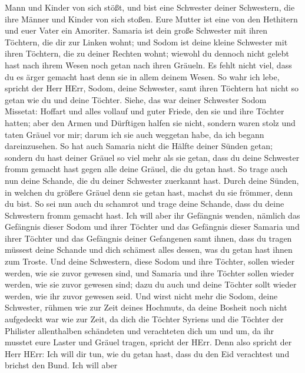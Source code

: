 Mann und Kinder von sich stößt, und bist eine Schwester deiner
Schwestern, die ihre Männer und Kinder von sich stoßen. Eure Mutter ist
eine von den Hethitern und euer Vater ein Amoriter. 
Samaria ist dein große Schwester mit ihren Töchtern, die dir zur Linken
wohnt; und Sodom ist deine kleine Schwester mit ihren Töchtern, die zu
deiner Rechten wohnt;  wiewohl du dennoch nicht gelebt hast
nach ihrem Wesen noch getan nach ihren Gräueln. Es fehlt nicht viel,
dass du es ärger gemacht hast denn sie in allem deinem Wesen.
 So wahr ich lebe, spricht der Herr HErr, Sodom, deine
Schwester, samt ihren Töchtern hat nicht so getan wie du und deine
Töchter.  Siehe, das war deiner Schwester Sodom Missetat:
Hoffart und alles vollauf und guter Friede, den sie und ihre Töchter
hatten; aber den Armen und Dürftigen halfen sie nicht, 
sondern waren stolz und taten Gräuel vor mir; darum ich sie auch
weggetan habe, da ich begann dareinzusehen.  So hat auch
Samaria nicht die Hälfte deiner Sünden getan; sondern du hast deiner
Gräuel so viel mehr als sie getan, dass du deine Schwester fromm gemacht
hast gegen alle deine Gräuel, die du getan hast.  So trage
auch nun deine Schande, die du deiner Schwester zuerkannt hast. Durch
deine Sünden, in welchen du größere Gräuel denn sie getan hast, machst
du sie frömmer, denn du bist. So sei nun auch du schamrot und trage
deine Schande, dass du deine Schwestern fromm gemacht hast.
 Ich will aber ihr Gefängnis wenden, nämlich das Gefängnis
dieser Sodom und ihrer Töchter und das Gefängnis dieser Samaria und
ihrer Töchter und das Gefängnis deiner Gefangenen samt ihnen,
 dass du tragen müssest deine Schande und dich schämest
alles dessen, was du getan hast ihnen zum Troste.  Und
deine Schwestern, diese Sodom und ihre Töchter, sollen wieder werden,
wie sie zuvor gewesen sind, und Samaria und ihre Töchter sollen wieder
werden, wie sie zuvor gewesen sind; dazu du auch und deine Töchter sollt
wieder werden, wie ihr zuvor gewesen seid.  Und wirst nicht
mehr die Sodom, deine Schwester, rühmen wie zur Zeit deines Hochmuts,
 da deine Bosheit noch nicht aufgedeckt war wie zur Zeit,
da dich die Töchter Syriens und die Töchter der Philister allenthalben
schändeten und verachteten dich um und um,  da ihr musstet
eure Laster und Gräuel tragen, spricht der HErr.  Denn also
spricht der Herr HErr: Ich will dir tun, wie du getan hast, dass du den
Eid verachtest und brichst den Bund.  Ich will aber

